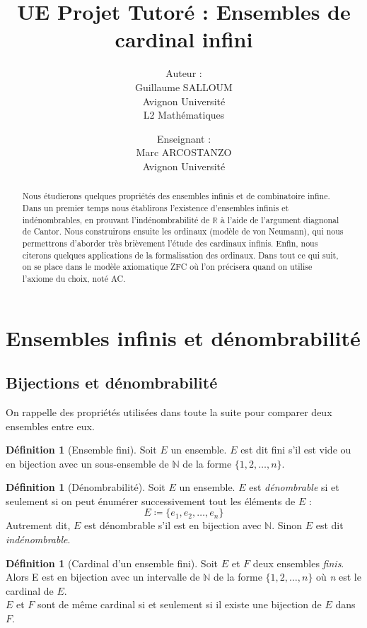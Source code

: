 \documentclass{article}
\title{UE Projet Tutoré : Ensembles de cardinal infini}
\author{Auteur :\\
	Guillaume SALLOUM \\ 
	Avignon Université \\ 
	L2 Mathématiques
	\and
	Enseignant : \\
	Marc ARCOSTANZO \\
	Avignon Université}
\date{}
\theoremstyle{definition}
\newtheorem{definition}[subsubsection]{Définition}
\theoremstyle{plain}
\theoremstyle{plain}
\theoremstyle{plain}
\theoremstyle{plain}
\theoremstyle{plain}
\begin{document}
\maketitle
\begin{abstract}
	Nous étudierons quelques propriétés des ensembles infinis et de combinatoire infine.
	Dans un premier temps nous établirons l'existence d'ensembles infinis et indénombrables, en prouvant l'indénombrabilité de \( \mathbb{R} \) à l'aide de l'argument diagnonal de Cantor. 
	Nous construirons ensuite les ordinaux (modèle de von Neumann), qui nous permettrons d'aborder très brièvement l'étude des cardinaux infinis. Enfin, nous citerons quelques applications de la formalisation des ordinaux.
	Dans tout ce qui suit, on se place dans le modèle axiomatique ZFC où l'on précisera quand on utilise l'axiome du choix, noté AC. 
\end{abstract}


\tableofcontents
\clearpage
\section{Ensembles infinis et dénombrabilité}
\subsection{Bijections et dénombrabilité}

On rappelle des propriétés utilisées dans toute la suite pour comparer deux ensembles entre eux.

\begin{definition}[Ensemble fini]
	Soit \( E \) un ensemble.
	\( E \) est dit fini s'il est vide ou en bijection avec un sous-ensemble de \( \mathbb{N} \) de la forme \( \{1, 2, \ldots, n\} \).
\end{definition}

\begin{definition}[Dénombrabilité]
	Soit \( E \) un ensemble. \( E \) est \textit{dénombrable} si et seulement si on peut énumérer successivement tout les éléments de \( E \) :
\begin{equation*}
	E \coloneqq \{e_{1}, e_{2}, \ldots, e_{n}\} 
\end{equation*} 
	Autrement dit, \( E \) est dénombrable s'il est en bijection avec \( \mathbb{N} \). Sinon \( E \) est dit \textit{indénombrable}.
\end{definition}
\begin{definition}[Cardinal d'un ensemble fini]
	Soit \( E \) et \( F \) deux ensembles \textit{finis}.
	Alors E est en bijection avec un intervalle de \( \mathbb{N} \) de la forme \( \{1, 2, \ldots, n\} \) où \textit{n} est le cardinal de \( E \). \\
	\( E \) et \( F \) sont de même cardinal si et seulement si il existe une bijection de \( E \) dans \( F \).
\
\end{definition}
\end{document}

